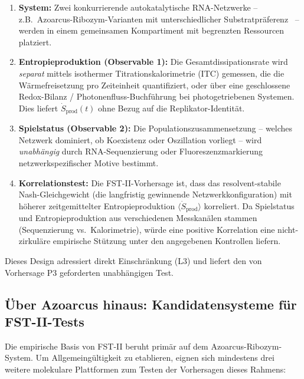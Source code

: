 \documentclass[12pt,a4paper]{article}
\theoremstyle{remark}
\begin{document}
\begin{enumerate}
    \item \textbf{System:} Zwei konkurrierende autokatalytische RNA-Netzwerke -- z.B.\ Azoarcus-Ribozym-Varianten mit unterschiedlicher Substratpräferenz~\citep{AzoarcusPMC} -- werden in einem gemeinsamen Kompartiment mit begrenzten Ressourcen platziert.
    \item \textbf{Entropieproduktion (Observable 1):} Die Gesamtdissipationsrate wird \emph{separat} mittels isothermer Titrationskalorimetrie (ITC) gemessen, die die Wärmefreisetzung pro Zeiteinheit quantifiziert, oder über eine geschlossene Redox-Bilanz / Photonenfluss-Buchführung bei photogetriebenen Systemen. Dies liefert $\dot{S}_{\mathrm{prod}}(t)$ ohne Bezug auf die Replikator-Identität.
    \item \textbf{Spielstatus (Observable 2):} Die Populationszusammensetzung -- welches Netzwerk dominiert, ob Koexistenz oder Oszillation vorliegt -- wird \emph{unabhängig} durch RNA-Sequenzierung oder Fluoreszenzmarkierung netzwerkspezifischer Motive bestimmt.
    \item \textbf{Korrelationstest:} Die FST-II-Vorhersage ist, dass das resolvent-stabile Nash-Gleichgewicht (die langfristig gewinnende Netzwerkkonfiguration) mit höherer zeitgemittelter Entropieproduktion $\langle\dot{S}_{\mathrm{prod}}\rangle$ korreliert. Da Spielstatus und Entropieproduktion aus verschiedenen Messkanälen stammen (Sequenzierung vs.\ Kalorimetrie), würde eine positive Korrelation eine nicht-zirkuläre empirische Stützung unter den angegebenen Kontrollen liefern.
\end{enumerate}

\noindent
Dieses Design adressiert direkt Einschränkung (L3) und liefert den von Vorhersage P3 geforderten unabhängigen Test.

\subsection{Über Azoarcus hinaus: Kandidatensysteme für FST-II-Tests}
\label{sec:beyond-azoarcus}

Die empirische Basis von FST-II beruht primär auf dem Azoarcus-Ribozym-System. Um Allgemeingültigkeit zu etablieren, eignen sich mindestens drei weitere molekulare Plattformen zum Testen der Vorhersagen dieses Rahmens:
\end{document}
